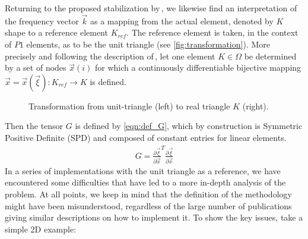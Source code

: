Returning to the proposed stabilization by\,\cite{Bazilevs2007}, we likewise find an interpretation of the frequency vector $\vec{k}$ as a mapping from the actual element, denoted by $K$ shape to a reference element $K_{ref}$. The reference element is taken, in the context of $P1$ elements, as to be the unit triangle (see \autoref{fig:transformation}). More precisely and following the description of\,\cite{Bazilevs2007}, let one element $K\in\Omega$ be determined by a set of nodes $\vec{x}(i)$ for which a continuously differentiable bijective mapping $\vec{x} = \vec{x}(\vec{\xi}): K_{ref} \rightarrow K$ is defined.
\begin{figure}[ht]
	\centering
	
	\caption[2D element transformation]{Transformation from unit-triangle (left) to real triangle $K$ (right).}\label{fig:transformation}
\end{figure}
Then the tensor $G$ is defined by \autoref{eqn:def_G}, which by construction is Symmetric Positive Definite (SPD) and composed of constant entries for linear elements.
\begin{equation}
	\begin{split}
		G = \frac{\partial \vec{\xi}}{\partial \vec{x}}^T \frac{\partial \vec{\xi}}{\partial \vec{x}}
	\end{split}\label{eqn:def_G}
\end{equation}
In a series of implementations with the unit triangle as a reference, we have encountered some difficulties that have led to a more in-depth analysis of the problem. At all points, we keep in mind that the definition of the methodology might have been misunderstood, regardless of the large number of publications giving similar descriptions on how to implement it. To show the key issues, take a simple 2D example:
